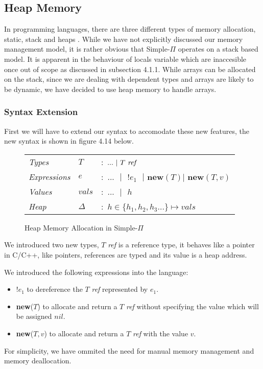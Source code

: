 \documentclass[a4paper,12pt]{report}
\begin{document}
\subsection{Heap Memory}
In programming languages, there are three different types of memory allocation, 
static, stack and heaps \cite{heapVsStack}. While we have not explicitly 
discussed our memory management model, it is rather obvious that Simple-$\Pi$ 
operates on a stack based model. It is apparent in the behaviour of locals 
variable which are inaccesible once out of scope as discussed in subsection 
4.1.1. While arrays can be allocated on the stack, since we are dealing 
with dependent types and arrays are likely to be dynamic, we have decided to use heap 
memory to handle arrays. 

\subsubsection{Syntax Extension}
First we will have to extend our syntax to accomodate these new features, the 
new syntax is shown in figure 4.14 below.

\begin{figure}[H]
  \begin{center}
    \begin{tabular} {l l l}
      \textit{Types} & $T$ & $:$ $...\text{ }|\text{ }T\text{ \textit{ref }}$ \\
      \textit{Expressions} & $e$ & $:$ $...\text{ }|\text{ }!e_1\text{ }|\textbf{ new}(T)|\textbf{ new}(T, v)$\\
     \textit{Values} & $vals$& $:$ $...\text{ }|\text{ }h$ \\
     \textit{Heap} & $\Delta$& $:$ $h \in \{h_1,h_2, h_3...\} \mapsto vals$\\
    \end{tabular}
  \end{center}
  \caption{Heap Memory Allocation in Simple-$\Pi$}
\end{figure}

\par
We introduced two new types, $T$ \textit{ref} is a reference type, it behaves 
like a pointer in C/C++, like pointers, references are typed and its value is a heap address. 


\par
We introduced the following expressions into the language:
\begin{itemize}
  \item $!e_1$ to dereference the $T$ \textit{ref} represented by $e_1$.
  \item \textbf{new}($T$) to allocate and return a $T$ \textit{ref} without specifying the value 
  which will be assigned $nil$.
  \item \textbf{new}($T, v$) to allocate and return a $T$ \textit{ref} with the 
  value $v$.
\end{itemize}
\par
For simplicity, we have ommited the need for manual memory management and memory 
deallocation.
\end{document}
